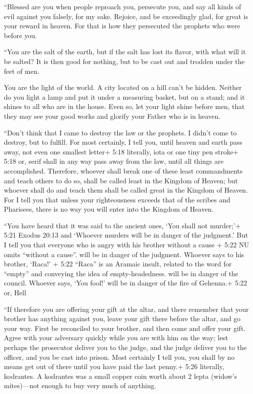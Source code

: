  ``Blessed are you when people reproach you, persecute you,
and say all kinds of evil against you falsely, for my sake.
 Rejoice, and be exceedingly glad, for great is your reward
in heaven. For that is how they persecuted the prophets who were before
you.

 ``You are the salt of the earth, but if the salt has lost
its flavor, with what will it be salted? It is then good for nothing,
but to be cast out and trodden under the feet of men.

 You are the light of the world. A city located on a hill
can't be hidden.  Neither do you light a lamp and put it
under a measuring basket, but on a stand; and it shines to all who are
in the house.  Even so, let your light shine before men,
that they may see your good works and glorify your Father who is in
heaven.

 ``Don't think that I came to destroy the law or the
prophets. I didn't come to destroy, but to fulfill.  For
most certainly, I tell you, until heaven and earth pass away, not even
one smallest letter+ 5:18 literally, iota or one tiny pen stroke+ 5:18
or, serif shall in any way pass away from the law, until all things are
accomplished.  Therefore, whoever shall break one of these
least commandments and teach others to do so, shall be called least in
the Kingdom of Heaven; but whoever shall do and teach them shall be
called great in the Kingdom of Heaven.  For I tell you that
unless your righteousness exceeds that of the scribes and Pharisees,
there is no way you will enter into the Kingdom of Heaven.

 ``You have heard that it was said to the ancient ones,
`You shall not murder;'+ 5:21 Exodus 20:13 and `Whoever murders will be
in danger of the judgment.'  But I tell you that everyone
who is angry with his brother without a cause + 5:22 NU omits ``without
a cause''. will be in danger of the judgment. Whoever says to his
brother, `Raca!' + 5:22 ``Raca'' is an Aramaic insult, related to the
word for ``empty'' and conveying the idea of empty-headedness. will be
in danger of the council. Whoever says, `You fool!' will be in danger of
the fire of Gehenna.+ 5:22 or, Hell

 ``If therefore you are offering your gift at the altar,
and there remember that your brother has anything against you,
 leave your gift there before the altar, and go your way.
First be reconciled to your brother, and then come and offer your gift.
 Agree with your adversary quickly while you are with him
on the way; lest perhaps the prosecutor deliver you to the judge, and
the judge deliver you to the officer, and you be cast into prison.
 Most certainly I tell you, you shall by no means get out
of there until you have paid the last penny.+ 5:26 literally, kodrantes.
A kodrantes was a small copper coin worth about 2 lepta (widow's
mites)---not enough to buy very much of anything.

